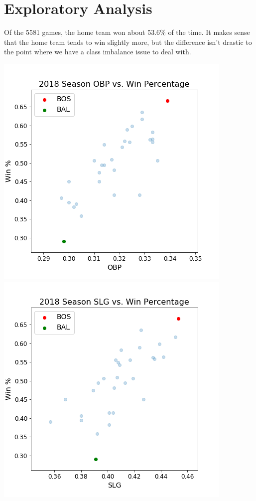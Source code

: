 \documentclass[12pt,onecolumn]{article}
\begin{document}
\section*{Exploratory Analysis}
Of the 5581 games, the home team won about 53.6\% of the time. It makes sense that the home team tends to win slightly more, but the difference isn't drastic to the point where we have a class imbalance issue to deal with.

\begin{center}
\includegraphics[scale=0.52]{obp_winp}
\includegraphics[scale=0.52]{slg_winp}
\end{center}
\end{document}
